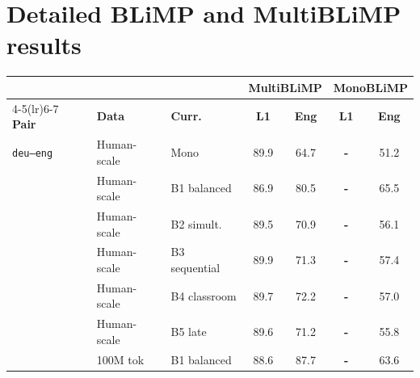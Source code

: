
\section{Detailed \beetle{} BLiMP and MultiBLiMP results}

\begin{table}[t]
\centering\scriptsize
\setlength{\tabcolsep}{3pt}
\begin{minipage}[t]{0.49\linewidth}\centering
\begin{tabular}{ll l cc cc}
\toprule
& & & \multicolumn{2}{c}{\textbf{MultiBLiMP}} & \multicolumn{2}{c}{\textbf{MonoBLiMP}} \\
\cmidrule(lr){4-5}\cmidrule(lr){6-7}
\textbf{Pair} & \textbf{Data} & \textbf{Curr.} & \textbf{L1} & \textbf{Eng} & \textbf{L1} & \textbf{Eng} \\
\midrule
\texttt{deu--eng} & Human-scale & Mono & \cellcolor[rgb]{0.779,1.000,0.779} 89.9 & \cellcolor[rgb]{0.920,1.000,0.920} 64.7 & \textbf{-} & \cellcolor[rgb]{0.990,1.000,0.990} 51.2 \\
 & Human-scale & B1 balanced & \cellcolor[rgb]{0.796,1.000,0.796} 86.9 & \cellcolor[rgb]{0.834,1.000,0.834} 80.5 & \textbf{-} & \cellcolor[rgb]{0.872,1.000,0.872} 65.5 \\
 & Human-scale & B2 simult. & \cellcolor[rgb]{0.781,1.000,0.781} 89.5 & \cellcolor[rgb]{0.886,1.000,0.886} 70.9 & \textbf{-} & \cellcolor[rgb]{0.950,1.000,0.950} 56.1 \\
 & Human-scale & B3 sequential & \cellcolor[rgb]{0.779,1.000,0.779} 89.9 & \cellcolor[rgb]{0.884,1.000,0.884} 71.3 & \textbf{-} & \cellcolor[rgb]{0.939,1.000,0.939} 57.4 \\
 & Human-scale & B4 classroom & \cellcolor[rgb]{0.780,1.000,0.780} 89.7 & \cellcolor[rgb]{0.879,1.000,0.879} 72.2 & \textbf{-} & \cellcolor[rgb]{0.942,1.000,0.942} 57.0 \\
 & Human-scale & B5 late & \cellcolor[rgb]{0.781,1.000,0.781} 89.6 & \cellcolor[rgb]{0.884,1.000,0.884} 71.2 & \textbf{-} & \cellcolor[rgb]{0.952,1.000,0.952} 55.8 \\
\addlinespace[1.5pt]
 & 100M tok & B1 balanced & \cellcolor[rgb]{0.786,1.000,0.786} 88.6 & \cellcolor[rgb]{0.794,1.000,0.794} 87.7 & \textbf{-} & \cellcolor[rgb]{0.888,1.000,0.888} 63.6 \\

\end{tabular}
\end{minipage}
\end{table}
